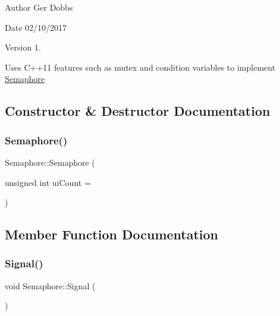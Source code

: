 \begin{DoxyAuthor}{Author}
Ger Dobbs 
\end{DoxyAuthor}
\begin{DoxyDate}{Date}
02/10/2017 
\end{DoxyDate}
\begin{DoxyVersion}{Version}
1.
\end{DoxyVersion}
Uses C++11 features such as mutex and condition variables to implement \hyperlink{classSemaphore}{Semaphore} 

\subsection{Constructor \& Destructor Documentation}
\mbox{\label{classSemaphore_a0d9290d316636875ca85d1d78950a817}} 
\subsubsection{\texorpdfstring{Semaphore()}{Semaphore()}}
{\footnotesize\ttfamily Semaphore\+::\+Semaphore (\begin{DoxyParamCaption}\item[{unsigned int}]{ui\+Count = {} }\end{DoxyParamCaption})\hspace{0.3cm}{\ttfamily [inline]}}



\subsection{Member Function Documentation}
\mbox{\label{classSemaphore_a86f92f738b4486439b296d8e235895f2}} 
\subsubsection{\texorpdfstring{Signal()}{Signal()}}
{\footnotesize\ttfamily void Semaphore\+::\+Signal (\begin{DoxyParamCaption}{ }\end{DoxyParamCaption})}

\mbox{\label{classSemaphore_a72aabebf026e3a8b1f3e4d0fa8ee1eda}} 

